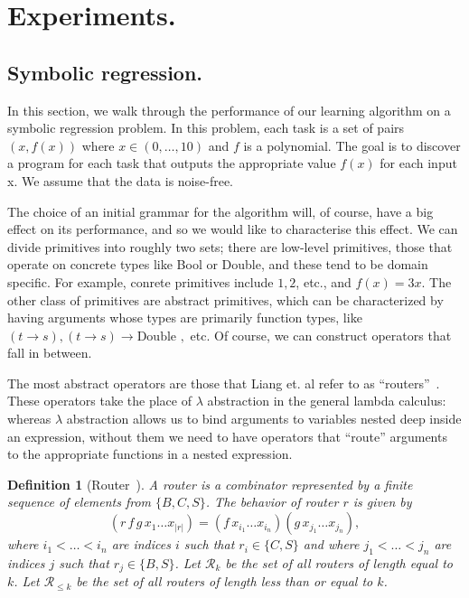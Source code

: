 \documentclass{article}
\newtheorem{definition}{Definition}
\begin{document}
\section{Experiments.}
\subsection{Symbolic regression.}

In this section, we walk through the performance of our learning
algorithm on a symbolic regression problem. In this problem,
each task is a set of pairs $ (x, f(x))$ where $x \in (0, \dots, 10)$
and $f$ is a polynomial. The goal is to discover a program for each
task that outputs the appropriate value $f(x)$ for each input x. We
assume that the data is noise-free.

The choice of an initial grammar for the algorithm will, of course,
have a big effect on its performance, and so we would like to
characterise this effect. We can divide primitives into roughly two
sets; there are low-level primitives, those that operate on concrete
types like Bool or Double, and these tend to be domain specific. For
example, conrete primitives include $1, 2$, etc., and $f(x) = 3x$. The
other class of primitives are abstract primitives, which can be
characterized by having arguments whose types are primarily function
types, like $(t \rightarrow s), (t \rightarrow s) \rightarrow \text{
  Double },$ etc. Of course, we can construct operators that fall in
between. 

The most abstract operators are those that Liang et. al refer to as
``routers''~\cite{liang10programs}. These operators take the place of
$\lambda$ abstraction in the general lambda calculus: whereas
$\lambda$ abstraction allows us to bind arguments to variables nested
deep inside an expression, without them we need to have operators that
``route'' arguments to the appropriate functions in a nested
expression. 

\begin{definition}[Router~\cite{liang10programs}] A \emph{router} is a combinator
represented by a finite sequence of elements from $\{B, C, S\}$. The
behavior of router $r$ is given by
\[
(r \, f \, g \, x_1 \dots x_{|r|}) = (f \, x_{i_1} \dots x_{i_n}) (g
\, x_{j_1} \dots x_{j_n}),
\]
where $i_1 < \dots < i_n$ are indices $i$ such that $r_i \in \{C, S\}$
and where $j_1 < \dots < j_n$ are indices $j$ such that $r_j \in \{B,
S\}$. Let $\mathcal{R}_k$ be the set of all routers of length equal to
$k$. Let $\mathcal{R}_{\leq k}$ be the set of all routers of length
less than or equal to $k$.
\end{definition}
\end{document}
